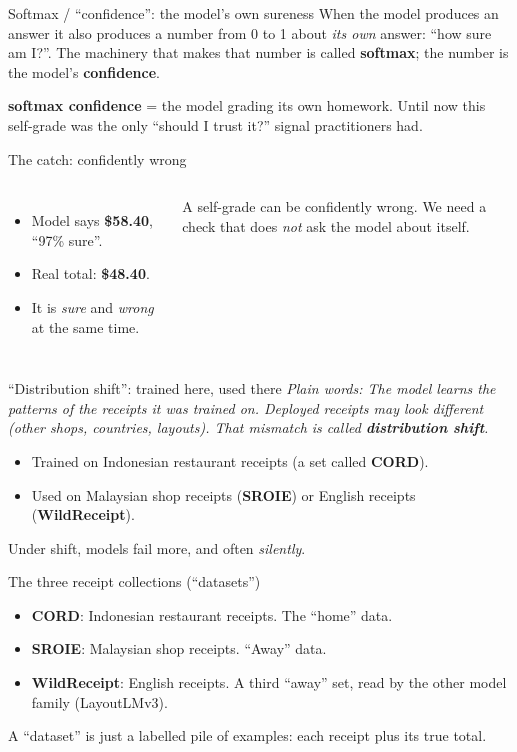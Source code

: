 \documentclass[aspectratio=169]{beamer}
\newcommand{\keybox}[1]{\begin{center}\colorbox{grey!15}{\parbox{0.92\linewidth}{\centering #1}}\end{center}}
\newcommand{\plain}[1]{\textit{\textcolor{sig}{Plain words:} #1}}
\begin{document}
\begin{frame}{Softmax / ``confidence'': the model's own sureness}
When the model produces an answer it also produces a number from 0 to
1 about \emph{its own} answer: ``how sure am I?''. The machinery that
makes that number is called \textbf{softmax}; the number is the
model's \textbf{confidence}.
\vspace{1em}
\keybox{\textbf{softmax confidence} = the model grading its own
homework. Until now this self-grade was the only ``should I trust
it?'' signal practitioners had.}
\end{frame}

\begin{frame}{The catch: confidently wrong}
\begin{columns}
\begin{itemize}
\item Model says \textbf{\$58.40}, ``\textcolor{smx}{97\% sure}''.
\item Real total: \textbf{\$48.40}.
\item It is \emph{sure} and \emph{wrong} at the same time.
\end{itemize}
\keybox{A self-grade can be confidently wrong. We need a check that
does \emph{not} ask the model about itself.}
\end{columns}
\end{frame}

\begin{frame}{``Distribution shift'': trained here, used there}
\plain{The model learns the patterns of the receipts it was trained
on. Deployed receipts may look different (other shops, countries,
layouts). That mismatch is called \textbf{distribution shift}.}
\vspace{1em}
\begin{itemize}
\item Trained on Indonesian restaurant receipts (a set called
\textbf{CORD}).
\item Used on Malaysian shop receipts (\textbf{SROIE}) or English
receipts (\textbf{WildReceipt}).
\end{itemize}
Under shift, models fail more, and often \emph{silently}.
\end{frame}

\begin{frame}{The three receipt collections (``datasets'')}
\begin{itemize}
\item \textbf{CORD}: Indonesian restaurant receipts. The ``home''
data.
\item \textbf{SROIE}: Malaysian shop receipts. ``Away'' data.
\item \textbf{WildReceipt}: English receipts. A third ``away'' set,
read by the other model family (LayoutLMv3).
\end{itemize}
\vspace{1em}
\keybox{A ``dataset'' is just a labelled pile of examples: each
receipt plus its true total.}
\end{frame}
\end{document}
